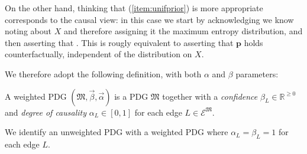 \documentclass{article}
\theoremstyle{plain}
\theoremstyle{definition}
\newenvironment{example}
	{\pushQED{\qed}\renewcommand{\qedsymbol}{$\triangle$}\examplex}
	{\popQED\endexamplex%
}
\theoremstyle{remark}
\newcommand\mat[1]{\mathbf{#1}}
\newcommand{\Ed}{\mathcal E}
\newcommand{\dg}[1]{\mathfrak{#1}}
\numberwithin{equation}{section}
\begin{document}
{\begin{example}
		
		On the other hand, thinking that (\ref{item:unifprior}) is more appropriate corresponds to the causal view: in this case we start by acknowledging we know noting about $X$ and therefore assigning it the maximum entropy distribution, and then asserting that . This is rougly equivalent to asserting that $\mat p$ holds counterfactually, independent of the distribution on $X$. 
	\end{example}
	
	We therefore adopt the following definition, with both $\alpha$ and $\beta$ parameters:

	\begin{defn}
		A weighted PDG $(\dg M, \vec \beta, \vec \alpha)$ is a PDG
	        $\dg M$ together with a \emph{confidence} $\beta_L \in \mathbb
	        R^{\geq 0}$ and \emph{degree of causality} $\alpha_L \in
	        [0,1]$ for each edge $L \in \Ed^\dg M$. 
	\end{defn}

	We identify an unweighted PDG with a weighted PDG where $\alpha_L
	= \beta_L = 1$ for each edge $L$.
}
%





\end{document}
